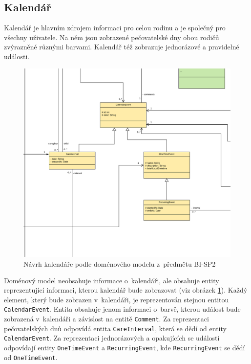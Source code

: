     \subsection{Kalendář}    
        Kalendář je hlavním zdrojem informaci pro celou rodinu a je společný pro všechny uživatele. Na něm jsou zobrazené pečovatelské dny obou rodičů zvýrazněné různými barvami. Kalendář též zobrazuje jednorázové a pravidelné události.
        
        \begin{figure}\centering
	        \includegraphics[width=1.0\textwidth]{pdfs/CalendarInfo1}
	        \caption[Předešlý návrh kalendáře]{Návrh kalendáře podle doménového modelu z~předmětu BI-SP2}\label{image:calendar-info}
        \end{figure}
        Doménový model neobsahuje informace o~kalendáři, ale obsahuje entity reprezentující informaci, kterou kalendář bude zobrazovat (viz obrázek \ref{image:calendar-info}). Každý element, který bude zobrazen v~kalendáři, je reprezentován stejnou entitou \verb|CalendarEvent|. Entita obsahuje jenom informaci o~barvě, kterou událost bude zobrazená v~kalendáři a závislost na entitě \verb|Comment|. Za reprezentaci pečovatelských dnů odpovídá entita \verb|CareInterval|, která se dědí od entity \verb|CalendarEvent|. Za reprezentaci jednorázových a opakujících se událostí odpovídají entity \verb|OneTimeEvent| a \verb|RecurringEvent|, kde \verb|RecurringEvent| se dědí od \verb|OneTimeEvent|.
        
